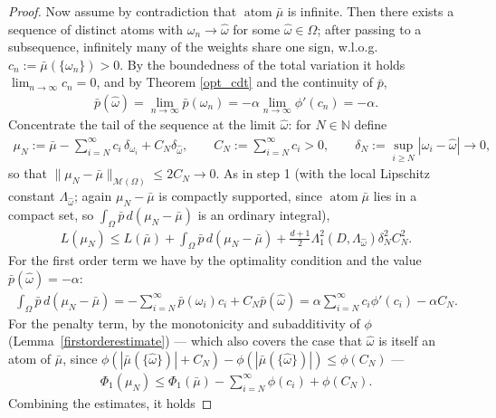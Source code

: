 \documentclass[11pt]{amsart}
\theoremstyle{definition}
\theoremstyle{remark}
\DeclareMathOperator{\atom}{atom}
\begin{document}
\begin{proof}
Now assume by contradiction that $\atom \bar{\mu}$ is infinite. Then there
exists a sequence of distinct atoms with $\omega_n \rightarrow \hat{\omega}$
for some $\hat{\omega} \in \Omega$; after passing to a subsequence, infinitely
many of the weights share one sign, w.l.o.g.\ 
$c_n := \bar{\mu}(\{\omega_n\}) > 0$. By the boundedness of the total
variation it holds $\lim_{n \rightarrow \infty} c_n = 0$, and by Theorem
\ref{opt_cdt} and the continuity of $\bar{p}$,
\begin{align*}
	\bar{p}(\hat{\omega}) = \lim_{n \rightarrow \infty} \bar{p}(\omega_n) = -\alpha \lim_{n\rightarrow \infty} \phi'(c_n) = -\alpha.
\end{align*}
Concentrate the tail of the sequence at the limit $\hat{\omega}$: for
$N \in \mathbb{N}$ define
\begin{align*}
	\mu_N := \bar{\mu} - \sum_{i = N}^\infty c_i \, \delta_{\omega_i} + C_N \delta_{\hat{\omega}}, \qquad C_N := \sum_{i = N}^\infty c_i > 0,
	\qquad \delta_N:= \sup_{i \ge N} |\omega_i - \hat{\omega}| \rightarrow 0,
\end{align*}
so that $\|\mu_N - \bar{\mu}\|_{\mathcal{M}(\Omega)} \le 2 C_N \rightarrow 0$.
As in step 1 (with the local Lipschitz constant $\Lambda_{\hat{\omega}}$; again
$\mu_N - \bar{\mu}$ is compactly supported, since $\atom \bar{\mu}$ lies in a
compact set, so $\int_\Omega \bar{p}\, d(\mu_N - \bar{\mu})$ is an ordinary integral),
\begin{align*}
	L(\mu_N) \le L(\bar{\mu}) + \int_\Omega \bar{p}\, d(\mu_N - \bar{\mu}) +\frac{d +1}{2} \Lambda_1^2(D, \Lambda_{\hat{\omega}}) \delta_N^2  C_N^2 .
\end{align*}
For the first order term we have by the optimality condition and the value
$\bar{p}(\hat{\omega}) = -\alpha$:
\begin{align*}
	\int_\Omega \bar{p}\, d(\mu_N - \bar{\mu}) = -\sum_{i = N}^\infty \bar{p}(\omega_i) c_i + C_N \bar{p}(\hat{\omega}) = \alpha \sum_{i = N}^\infty c_i \phi'(c_i) - \alpha C_N.
\end{align*}
For the penalty term, by the monotonicity and subadditivity of $\phi$
(Lemma~\ref{firstorderestimate}) --- which also covers the case that
$\hat{\omega}$ is itself an atom of $\bar{\mu}$, since
$\phi(|\bar{\mu}(\{\hat{\omega}\})| + C_N) - \phi(|\bar{\mu}(\{\hat{\omega}\})|) \le \phi(C_N)$ ---
\begin{align*}
	\Phi_1(\mu_N) \le \Phi_1(\bar{\mu}) - \sum_{i = N}^\infty \phi(c_i) + \phi(C_N).
\end{align*}
Combining the estimates, it holds

\end{proof}
\end{document}
